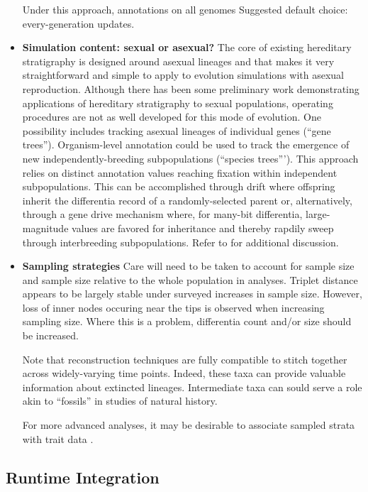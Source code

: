 \begin{itemize}
  Under this approach, annotations on all genomes
  Suggested default choice: every-generation updates.
\item \textbf{Simulation content: sexual or asexual?}
  The core of existing hereditary stratigraphy is designed around asexual lineages and that makes it very straightforward and simple to apply to evolution simulations with asexual reproduction.
  Although there has been some preliminary work demonstrating applications of hereditary stratigraphy to sexual populations, operating procedures are not as well developed for this mode of evolution.
  One possibility includes tracking asexual lineages of individual genes (``gene trees'').
  Organism-level annotation could be used to track the emergence of new independently-breeding subpopulations (``species trees''').
  This approach relies on distinct annotation values reaching fixation within independent subpopulations.
  This can be accomplished through drift where offspring inherit the differentia record of a randomly-selected parent or, alternatively, through a gene drive mechanism where, for many-bit differentia, large-magnitude values are favored for inheritance and thereby rapdily sweep through interbreeding subpopulations.
  Refer to \citep{moreno2024methods} for additional discussion.
\item \textbf{Sampling strategies}
Care will need to be taken to account for sample size and sample size relative to the whole population in analyses.
Triplet distance appears to be largely stable under surveyed increases in sample size.
However, loss of inner nodes occuring near the tips is observed when increasing sampling size.
Where this is a problem, differentia count and/or size should be increased.

Note that reconstruction techniques are fully compatible to stitch together across widely-varying time points.
Indeed, these taxa can provide valuable information about extincted lineages.
Intermediate taxa can sould serve a role akin to ``fossils'' in studies of natural history.

For more advanced analyses, it may be desirable to associate sampled strata with trait data \citep{TODOMODES,TODOCITEFROMJACOB}.

\end{itemize}

\subsection{Runtime Integration}

